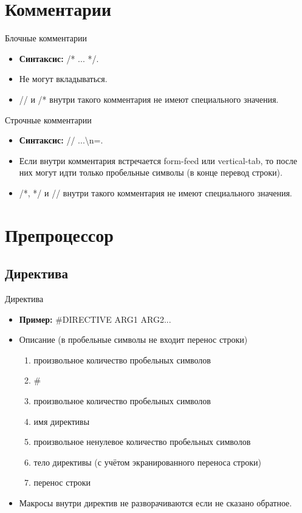     \section{Комментарии}
    \begin{frame}{Блочные комментарии}
        \begin{itemize}
            \item \textbf{Синтаксис:} /* ... */.
            \item Не могут вкладываться.
            \item // и /* внутри такого комментария не имеют специального значения.
        \end{itemize}
    \end{frame}
    \begin{frame}{Строчные комментарии}
        \begin{itemize}
            \item \textbf{Синтаксис:} // ...\textbackslash{n}=.
            \item Если внутри комментария встречается form-feed или vertical-tab, то после них могут идти только пробельные символы (в конце перевод строки).
            \item /*, */ и // внутри такого комментария не имеют специального значения.
        \end{itemize}
    \end{frame}
    \section{Препроцессор}
    \subsection{Директива}
    \begin{frame}{Директива}
        \begin{itemize}
            \item \textbf{Пример:} \#DIRECTIVE ARG1 ARG2...
            \item Описание (в пробельные символы не входит перенос строки)
                \begin{enumerate}
                    \item произвольное количество пробельных символов
                    \item \#
                    \item произвольное количество пробельных символов
                    \item имя директивы
                    \item произвольное ненулевое количество пробельных символов
                    \item тело директивы (с учётом экранированного переноса строки)
                    \item перенос строки
                \end{enumerate}
            \item Макросы внутри директив не разворачиваются если не сказано обратное.
        \end{itemize}
    \end{frame}
